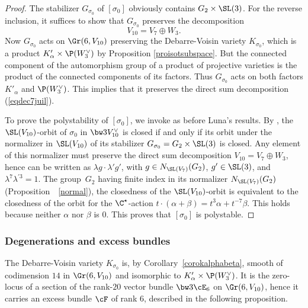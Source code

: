 \begin{proof} The stabilizer $G_{\sigma_0}$ of $[\sigma_0]$ obviously contains $G_2\times \SL(3)$. For the reverse inclusion, it suffices to show that $G_{\sigma_0}$ preserves the decomposition
\begin{equation}
\label{eqdec7juil}
V_{10}=V_7\oplus W_3.
\end{equation}
Now $G_{\sigma_0}$ acts on $\Gr(6,V_{10})$ preserving
the Debarre-Voisin variety $K_{\sigma_0}$, which is a product \mbox{$K'_\alpha\times \P(W_3^\vee)$} by Proposition
\ref{proisotsubspace}. But the connected component of the auto\-morphism group of a product
of projective varieties is the product of the connected components of its factors. Thus
$G_{\sigma_0}$ acts on both factors $K'_\alpha$ and $\P(W_3^\vee)$. This implies that it preserves the direct sum decomposition
(\ref{eqdec7juil}).

To prove the polystability of $[\sigma_0]$, we invoke as before Luna's results. By \cite[Cor.\,1]{luna}, the $\SL(V_{10})$-orbit of $\sigma_0$ in $\bw3V_{10}^\vee$ is closed if and only if its orbit under the normalizer in $\SL(V_{10})$ of its stabilizer $G_{\sigma_0}=G_2\times \SL(3)$ is closed. Any element of this normalizer must preserve the direct sum decomposition $V_{10}=V_7\oplus W_3$, hence can be written
as $ \lambda g \cdot \lambda' g' $, with $g \in N_{\SL(V_7)}(G_2)$, $g'\in \SL(3)$, and $\lambda^7\lambda^{\prime 3}=1$.
The group~$G_2$ having finite index in its normalizer $N_{\SL(V_7)}(G_2)$ (Proposition~~\ref{normal}), the closedness of
the $\SL(V_{10})$-orbit
is equivalent to the closedness of
the orbit for the $\C^\star$-action $t\cdot (\alpha+\beta)=t^3\alpha+t^{-7}\beta$. This holds because neither $\alpha$ nor $\beta$ is $0$. This proves that $[\sigma_0]$ is polystable.
\end{proof}

\subsubsection{Degenerations and excess bundles}

The Debarre-Voisin variety $K_{\sigma_0}$ is, by Corollary~\ref{corokalphabeta}, smooth of codimension $14$
in $\Gr(6,V_{10})$ and isomorphic to $K'_\alpha\times \P(W_3^\vee)$. It is the zero-locus of a section
of the rank-$20$ vector bundle $\bw3\cE_6$ on $\Gr(6,V_{10})$, hence it carries
an excess bundle $\cF$ of rank $6$, described in the
following proposition.

